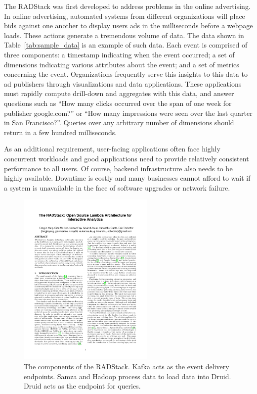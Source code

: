 \documentclass{vldb}
\begin{document}
The RADStack was first developed to address problems in the online advertising.
In online advertising, automated systems from different organizations will
place bids against one another to display users ads in the milliseconds before
a webpage loads. These actions generate a tremendous volume of data. The data
shown in Table~\ref{tab:sample_data} is an example of such data.  Each event is
comprised of three components: a timestamp indicating when the event occurred;
a set of dimensions indicating various attributes about the event; and a set of
metrics concerning the event. Organizations frequently serve this insights to
this data to ad publishers through visualizations and data applications. These
applications must rapidly compute drill-down and aggregates with this data, and 
answer questions such as “How many clicks occurred over the span of one week
for publisher google.com?” or “How many impressions were seen over the last
quarter in San Francisco?”. Queries over any arbitrary number of dimensions
should return in a few hundred milliseconds.

As an additional requirement, user-facing applications often face highly
concurrent workloads and good applications need to provide relatively
consistent performance to all users.  Of course, backend infrastructure also
needs to be highly available. Downtime is costly and many businesses cannot
afford to wait if a system is unavailable in the face of software upgrades or
network failure.

\begin{figure}
\centering
\includegraphics[width = 2.6in]{radstack}
\caption{
The components of the RADStack. Kafka acts as the event delivery
endpoints. Samza and Hadoop process data to load data into Druid. Druid acts as
the endpoint for queries.
}
\label{fig:radstack}
\end{figure}
\end{document}
